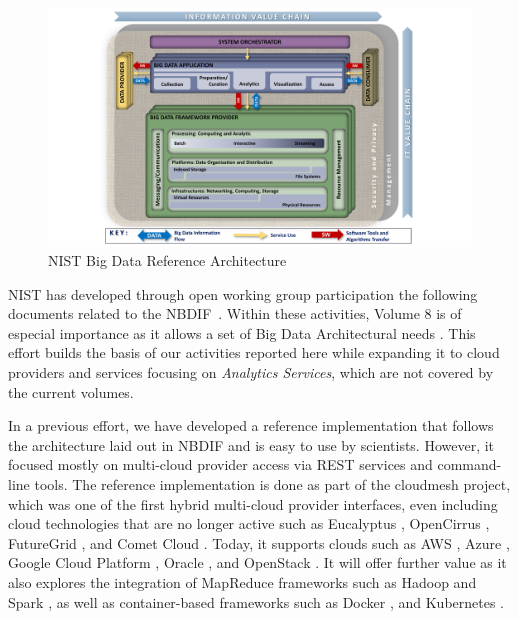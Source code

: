 \begin{figure}[htb]
\centering

\includegraphics[width=1.0\columnwidth]{images/NIST_RA_latest-crop.pdf}

\caption{NIST Big Data Reference Architecture \cite{nist-v8}}

\label{fig:bdra}
\end{figure}

NIST has developed through open working group participation the
following documents related to the
NBDIF~\cite{nist-v1,nist-v2,nist-v3,nist-v4,nist-v5,nist-v6,nist-v7,nist-v8,nist-v9}. Within
these activities, Volume 8 is of especial importance as it allows a
set of Big Data Architectural needs
\cite{cloudmesh-openapi}\cite{las20book-cloudeng}. This effort builds the basis of
our activities reported here while expanding it to cloud providers and
services focusing on {\em Analytics Services}, which are not covered
by the current volumes. 

In a previous effort, we have developed a reference implementation that follows the architecture laid out in NBDIF and is easy to use by scientists. 
However, it focused mostly on multi-cloud provider access via REST services and command-line tools. The reference implementation is done as part of the cloudmesh project, which was one of the first hybrid multi-cloud provider interfaces, even including cloud technologies that are no longer active such as Eucalyptus \cite{www-eucalyptus}, OpenCirrus \cite{opencirrus}, FutureGrid \cite{futuregrid}, and Comet Cloud \cite{las-comet}. Today, it supports clouds such as AWS \cite{www-aws}, Azure \cite{www-azure}, Google Cloud Platform \cite{www-google}, Oracle \cite{www-oracle-cloud}, and OpenStack \cite{www-openStack}. It will offer further value as it also explores the integration of MapReduce frameworks such as Hadoop \cite{www-hadoop} and Spark \cite{www-spark}, as well as container-based frameworks such as Docker \cite{www-docker}, and Kubernetes \cite{www-kubernetes}. 

